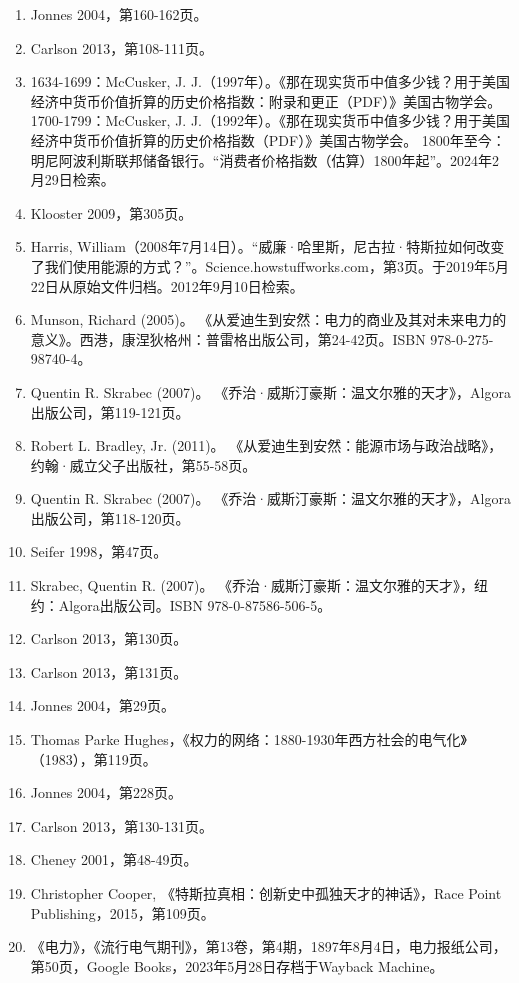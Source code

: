 \begin{enumerate}
\item Jonnes 2004，第160-162页。  
\item Carlson 2013，第108-111页。  
\item 1634-1699：McCusker, J. J.（1997年）。《那在现实货币中值多少钱？用于美国经济中货币价值折算的历史价格指数：附录和更正（PDF）》美国古物学会。  
1700-1799：McCusker, J. J.（1992年）。《那在现实货币中值多少钱？用于美国经济中货币价值折算的历史价格指数（PDF）》美国古物学会。  
1800年至今：明尼阿波利斯联邦储备银行。“消费者价格指数（估算）1800年起”。2024年2月29日检索。  
\item Klooster 2009，第305页。  
\item Harris, William（2008年7月14日）。“威廉·哈里斯，尼古拉·特斯拉如何改变了我们使用能源的方式？”。Science.howstuffworks.com，第3页。于2019年5月22日从原始文件归档。2012年9月10日检索。
\item Munson, Richard (2005)。 《从爱迪生到安然：电力的商业及其对未来电力的意义》。西港，康涅狄格州：普雷格出版公司，第24-42页。ISBN 978-0-275-98740-4。  
\item Quentin R. Skrabec (2007)。 《乔治·威斯汀豪斯：温文尔雅的天才》，Algora出版公司，第119-121页。  
\item Robert L. Bradley, Jr. (2011)。 《从爱迪生到安然：能源市场与政治战略》，约翰·威立父子出版社，第55-58页。  
\item Quentin R. Skrabec (2007)。 《乔治·威斯汀豪斯：温文尔雅的天才》，Algora出版公司，第118-120页。  
\item Seifer 1998，第47页。  
\item Skrabec, Quentin R. (2007)。 《乔治·威斯汀豪斯：温文尔雅的天才》，纽约：Algora出版公司。ISBN 978-0-87586-506-5。  
\item Carlson 2013，第130页。  
\item Carlson 2013，第131页。  
\item Jonnes 2004，第29页。  
\item Thomas Parke Hughes，《权力的网络：1880-1930年西方社会的电气化》（1983），第119页。  
\item Jonnes 2004，第228页。  
\item Carlson 2013，第130-131页。  
\item Cheney 2001，第48-49页。
\item Christopher Cooper, 《特斯拉真相：创新史中孤独天才的神话》，Race Point Publishing，2015，第109页。  
\item 《电力》，《流行电气期刊》，第13卷，第4期，1897年8月4日，电力报纸公司，第50页，Google Books，2023年5月28日存档于Wayback Machine。  

\end{enumerate}
